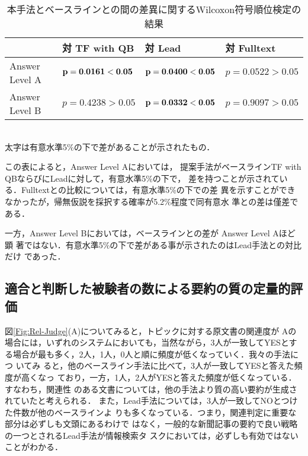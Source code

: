 \begin{table}[htbp]
 \caption{本手法とベースラインとの間の差異に関するWilcoxon符号順位検定の結果}
 \label{Table:Wilcoxon}
 \begin{center}
  \begin{tabular}{|l|l|l|l|}
   \hline
                & 対 TF with QB	 & 対 Lead  & 対 Fulltext\\
   \hline
   Answer Level A & $\bf{p=0.0161 < 0.05}$  &
                       $\bf{p=0.0400 < 0.05}$ & $p=0.0522 > 0.05$\\
   \hline
   Answer Level B	& $p=0.4238 > 0.05$ &
                       $\bf{p=0.0332 < 0.05}$& $p=0.9097 > 0.05$\\
   \hline
   \end{tabular}\\
  \vspace*{5pt}
  太字は有意水準5\%の下で差があることが示されたもの．
  \end{center}
\end{table}

この表によると，Answer Level Aにおいては，
提案手法がベースラインTF with QBならびにLeadに対して，有意水準5\%の下で，
差を持つことが示されている．Fulltextとの比較については，有意水準5\%の下での差
異を示すことができなかったが，帰無仮説を採択する確率が5.2\%程度で同有意水
準との差は僅差である．

一方，Answer Level Bにおいては，ベースラインとの差が Answer Level Aほど顕
著ではない．有意水準5\%の下で差がある事が示されたのはLead手法との対比だけ
であった．


\subsection{適合と判断した被験者の数による要約の質の定量的評価}

図\ref{Fig:Rel-Judge}(A)についてみると，トピックに対する原文書の関連度が
Aの場合には，いずれのシステムにおいても，当然ながら，3人が一致してYESとす
る場合が最も多く，2人，1人，0人と順に頻度が低くなっていく．我々の手法につ
いてみ
ると，他のベースライン手法に比べて，3人が一致してYESと答えた頻度が高くなっ
ており，一方，1人，2人がYESと答えた頻度が低くなっている．すなわち，関連性
のある文書については，他の手法より質の高い要約が生成されていたと考えられる．
また，Lead手法については，3人が一致してNOとつけた件数が他のベースラインよ
りも多くなっている．つまり，関連判定に重要な部分は必ずしも文頭にあるわけで
はなく，一般的な新聞記事の要約で良い戦略の一つとされるLead手法が情報検索タ
スクにおいては，必ずしも有効ではないことがわかる．

